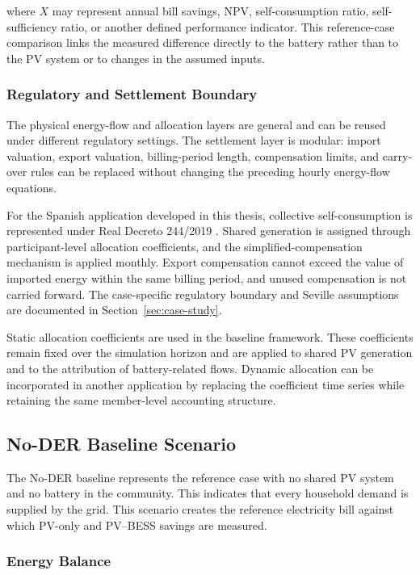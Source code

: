 where $X$ may represent annual bill savings, NPV, self-consumption ratio, self-sufficiency ratio, or another defined performance indicator. This reference-case comparison links the measured difference directly to the battery rather than to the PV system or to changes in the assumed inputs.

\subsubsection{Regulatory and Settlement Boundary}
\label{subsec:regulatory_settlement_boundary}

The physical energy-flow and allocation layers are general and can be reused under different regulatory settings. The settlement layer is modular: import valuation, export valuation, billing-period length, compensation limits, and carry-over rules can be replaced without changing the preceding hourly energy-flow equations.

For the Spanish application developed in this thesis, collective self-consumption is represented under Real Decreto 244/2019 \cite{boe2019real}. Shared generation is assigned through participant-level allocation coefficients, and the simplified-compensation mechanism is applied monthly. Export compensation cannot exceed the value of imported energy within the same billing period, and unused compensation is not carried forward. The case-specific regulatory boundary and Seville assumptions are documented in Section~\ref{sec:case-study}.

Static allocation coefficients are used in the baseline framework. These coefficients remain fixed over the simulation horizon and are applied to shared PV generation and to the attribution of battery-related flows. Dynamic allocation can be incorporated in another application by replacing the coefficient time series while retaining the same member-level accounting structure.

\subsection{No-DER Baseline Scenario}
\label{sec:no_der_baseline_ch4}

The No-DER baseline represents the reference case with no shared PV system and no battery in the community. This indicates that every household demand is supplied by the grid. This scenario creates the reference electricity bill against which PV-only and PV--BESS savings are measured.

\subsubsection{Energy Balance}
\label{subsec:no_der_energy_balance}


